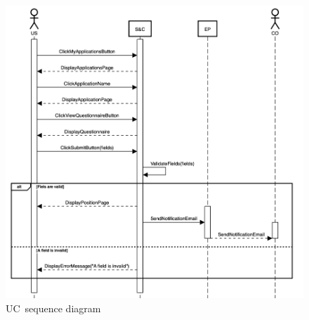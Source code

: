 \begin{figure}
    \centering
    \includegraphics[width=16cm]{images/sequence-diagrams/student-fills-out-questionnaire.png}
    \caption{UC\theuc\ sequence diagram}
\end{figure}


